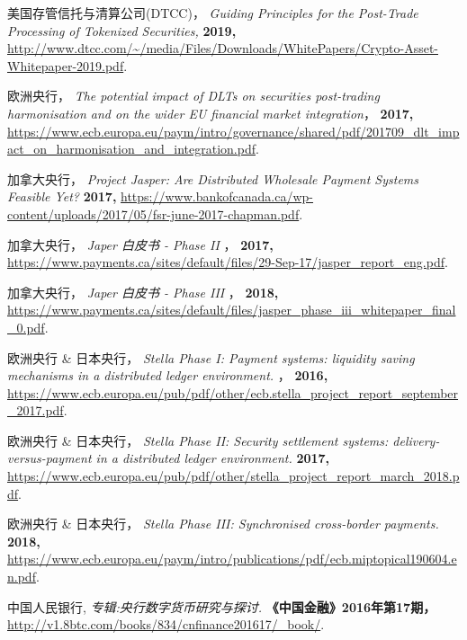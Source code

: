 \begin{thebibliography}{99}
     美国存管信托与清算公司(DTCC)，
    \newblock \textit{Guiding Principles for the Post-Trade Processing of Tokenized Securities, }
    \newblock \textbf{2019,}
    \newblock \url{http://www.dtcc.com/~/media/Files/Downloads/WhitePapers/Crypto-Asset-Whitepaper-2019.pdf}.

     欧洲央行，
    \newblock \textit{The potential impact of DLTs on securities post-trading harmonisation and on the wider EU financial market integration}，
    \newblock \textbf{2017,}
    \newblock \url{https://www.ecb.europa.eu/paym/intro/governance/shared/pdf/201709_dlt_impact_on_harmonisation_and_integration.pdf}.

     加拿大央行，
    \newblock \textit{Project Jasper: Are Distributed Wholesale Payment Systems Feasible Yet?}
    \newblock \textbf{2017,}
    \newblock \url{https://www.bankofcanada.ca/wp-content/uploads/2017/05/fsr-june-2017-chapman.pdf}.

     加拿大央行，
    \newblock \textit{Japer 白皮书 - Phase II }，
    \newblock \textbf{2017,}
    \newblock \url{https://www.payments.ca/sites/default/files/29-Sep-17/jasper_report_eng.pdf}.

     加拿大央行，
    \newblock \textit{Japer 白皮书 - Phase III }，
    \newblock \textbf{2018,}
    \newblock \url{https://www.payments.ca/sites/default/files/jasper_phase_iii_whitepaper_final_0.pdf}.
    
     欧洲央行 \& 日本央行，
    \newblock \textit{Stella Phase I: Payment systems: liquidity saving mechanisms in a distributed ledger environment. }，
    \newblock \textbf{2016,}
    \newblock \url{https://www.ecb.europa.eu/pub/pdf/other/ecb.stella_project_report_september_2017.pdf}.
    
     欧洲央行 \& 日本央行，
    \newblock \textit{Stella Phase II: Security settlement systems: delivery-versus-payment in a distributed ledger environment. }
    \newblock \textbf{2017,}
    \newblock \url{https://www.ecb.europa.eu/pub/pdf/other/stella_project_report_march_2018.pdf}.

     欧洲央行 \& 日本央行，
    \newblock \textit{Stella Phase III: Synchronised cross-border payments. }
    \newblock \textbf{2018,}
    \newblock \url{https://www.ecb.europa.eu/paym/intro/publications/pdf/ecb.miptopical190604.en.pdf}.

     中国人民银行,
    \newblock \textit{专辑:央行数字货币研究与探讨. }
    \newblock \textbf{《中国金融》2016年第17期，}
    \newblock \url{http://v1.8btc.com/books/834/cnfinance201617/_book/}.
    
\end{thebibliography}
